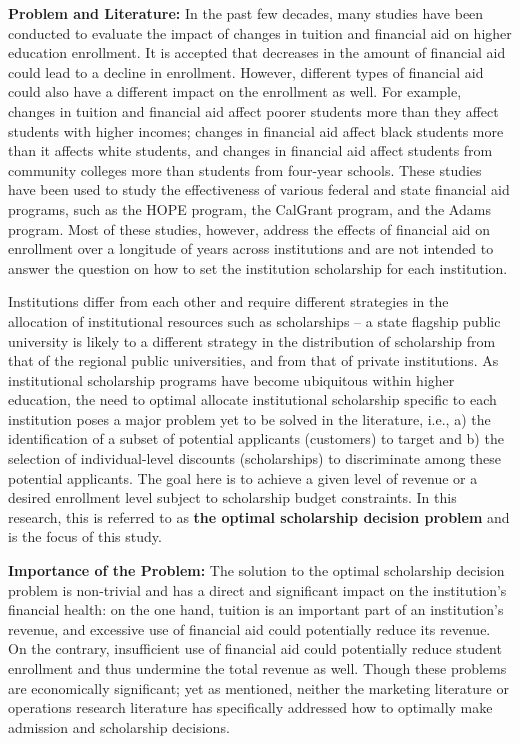 \documentclass[12pt,english]{report}
\begin{document}
\vspace*{.15in} 
\noindent \textbf{Problem and Literature:}
In the past few decades, many studies have been conducted to evaluate the impact of changes in tuition and financial aid on higher education enrollment. It is accepted that decreases in the amount of financial aid could lead to a decline in enrollment. However, different types of financial aid could also have a different impact on the enrollment as well. For example, changes in tuition and financial aid affect poorer students more than they affect students with higher incomes; changes in financial aid affect black students more than it affects white students, and changes in financial aid affect students from community colleges more than students from four-year schools. These studies have been used to study the effectiveness of various federal and state financial aid programs, such as the HOPE program, the CalGrant program, and the Adams program.  Most of these studies, however, address the effects of financial aid on enrollment over a longitude of years across institutions and are not intended to answer the question on how to set the institution scholarship for each institution. 

Institutions differ from each other and require different strategies in the allocation of institutional resources such as scholarships --  a state flagship public university is likely to a different strategy in the distribution of scholarship from that of the regional public universities, and from that of private institutions. As institutional scholarship programs have become ubiquitous within higher education, the need to optimal allocate institutional scholarship specific to each institution poses a major problem yet to be solved in the literature, i.e., a) the identification of a subset of potential applicants (customers) to target and b) the selection of individual-level discounts (scholarships) to discriminate among these potential applicants.  The goal here is to achieve a given level of revenue or a desired
enrollment level subject to scholarship budget constraints.  In this research, this is referred to as \textbf{the optimal scholarship decision problem} and is the focus of this study.

\vspace*{.15in} 
\noindent \textbf{Importance of the Problem:}
The solution to the optimal scholarship decision problem is non-trivial and has a direct and significant impact on the institution's financial health: on the one hand, tuition is an important part of an institution's revenue, and excessive use of financial aid could potentially reduce its revenue. On the contrary, insufficient use of financial aid could potentially reduce student enrollment and thus undermine the total revenue as well.  Though these problems are economically significant; yet as mentioned, neither the marketing literature or operations research literature has specifically addressed how to optimally
make admission and scholarship decisions.
\end{document}
